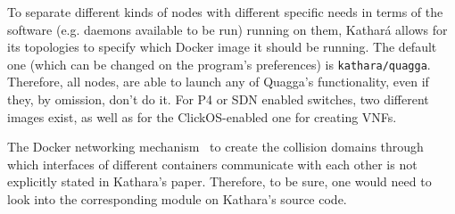 To separate different kinds of nodes with different specific needs in terms of the software (e.g. daemons available to be run) running on them, Kathará allows for its topologies to specify which Docker image it should be running.
The default one (which can be changed on the program's preferences) is \texttt{kathara/quagga}. Therefore, all nodes, are able to launch any of Quagga's functionality, even if they, by omission, don't do it.
For P4 or SDN enabled switches, two different images exist, as well as for the ClickOS-enabled one for creating VNFs.

The Docker networking mechanism~\cite{dockernetworking} to create the collision domains through which interfaces of different containers communicate with each other is not explicitly stated in Kathara's paper.
Therefore, to be sure, one would need to look into the corresponding module on Kathara's source code.


